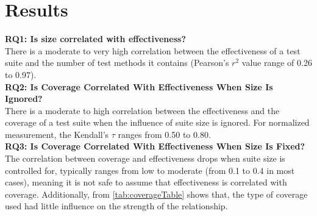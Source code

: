 \section{Results}

\textbf{RQ1: Is size correlated with effectiveness?}\\
There is a moderate to very high correlation between the effectiveness of a test suite and the number of test methods it contains (Pearson's $r^2$ value range of 0.26 to 0.97).\\

\textbf{RQ2: Is Coverage Correlated With Effectiveness When Size Is Ignored?}\\
There is a moderate to high correlation between the effectiveness and the coverage of a test suite when the influence of suite size is ignored. For normalized measurement, the Kendall's $\tau$ ranges from 0.50 to 0.80.\\

\textbf{RQ3: Is Coverage Correlated With Effectiveness When Size Is Fixed?}\\
The correlation between coverage and effectiveness drops when suite size is controlled for, typically ranges from low to moderate (from 0.1 to 0.4 in most cases), meaning it is not safe to assume that effectiveness is correlated with coverage. Additionally, from \ref{tab:coverageTable} shows that, the type of coverage used had little influence on the strength of the relationship.


